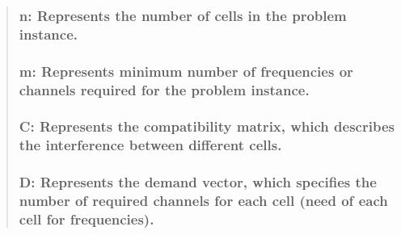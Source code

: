 \documentclass[11pt]{article}
\begin{document}
\begin{quote}
\hypertarget{n-represents-the-number-of-cells-in-the-problem-instance.}{%
\subsubsection{\texorpdfstring{ n: Represents the number of cells in the
problem
instance.}{  n: Represents the number of cells in the problem instance.}}\label{n-represents-the-number-of-cells-in-the-problem-instance.}}

\hypertarget{m-represents-minimum-number-of-frequencies-or-channels-required-for-the-problem-instance.}{%
\subsubsection{\texorpdfstring{ m: Represents minimum number of
frequencies or channels required for the problem
instance.}{  m: Represents minimum number of frequencies or channels required for the problem instance.}}\label{m-represents-minimum-number-of-frequencies-or-channels-required-for-the-problem-instance.}}

\hypertarget{c-represents-the-compatibility-matrix-which-describes-the-interference-between-different-cells.}{%
\subsubsection{\texorpdfstring{ C: Represents the compatibility matrix,
which describes the interference between different
cells.}{  C: Represents the compatibility matrix, which describes the interference between different cells.}}\label{c-represents-the-compatibility-matrix-which-describes-the-interference-between-different-cells.}}

\hypertarget{d-represents-the-demand-vector-which-specifies-the-number-of-required-channels-for-each-cell-need-of-each-cell-for-frequencies.}{%
\subsubsection{\texorpdfstring{ D: Represents the demand vector, which
specifies the number of required channels for each cell (need of each
cell for
frequencies).}{  D: Represents the demand vector, which specifies the number of required channels for each cell (need of each cell for frequencies).}}\label{d-represents-the-demand-vector-which-specifies-the-number-of-required-channels-for-each-cell-need-of-each-cell-for-frequencies.}}
\end{quote}
\end{document}
